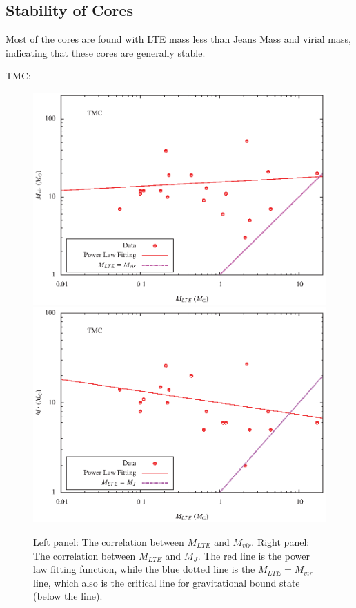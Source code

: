 \documentclass{article}
\begin{document}
    \subsection{Stability of Cores}
    Most of the cores are found with LTE mass less than Jeans Mass and virial mass, indicating that these cores are generally stable.

TMC:

\begin{figure}[h]
\includegraphics[totalheight=40mm]{M_vir_tmc.eps}
\includegraphics[totalheight=40mm]{M_j_tmc.eps}

{Left panel: The correlation between $M_{LTE}$ and $M_{vir}$. Right panel: The correlation between $M_{LTE}$ and $M_{J}$. The red line is the power law fitting function, while the blue dotted line is the $M_{LTE}=M_{vir}$line, which also is the critical line for gravitational bound state (below the line).}
\end{figure}
\end{document}
